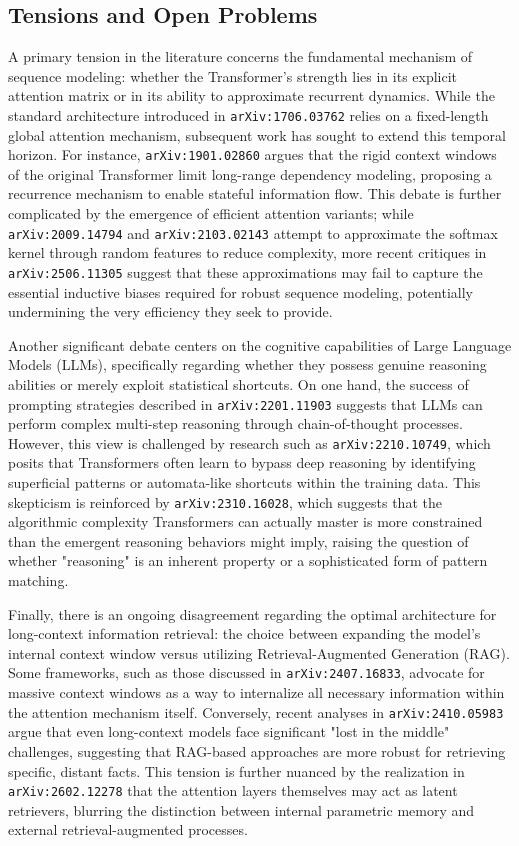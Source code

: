 \documentclass[11pt]{article}
\begin{document}
\subsection{Tensions and Open Problems}

A primary tension in the literature concerns the fundamental mechanism of sequence modeling: whether the Transformer's strength lies in its explicit attention matrix or in its ability to approximate recurrent dynamics. While the standard architecture introduced in \texttt{arXiv:1706.03762} relies on a fixed-length global attention mechanism, subsequent work has sought to extend this temporal horizon. For instance, \texttt{arXiv:1901.02860} argues that the rigid context windows of the original Transformer limit long-range dependency modeling, proposing a recurrence mechanism to enable stateful information flow. This debate is further complicated by the emergence of efficient attention variants; while \texttt{arXiv:2009.14794} and \texttt{arXiv:2103.02143} attempt to approximate the softmax kernel through random features to reduce complexity, more recent critiques in \texttt{arXiv:2506.11305} suggest that these approximations may fail to capture the essential inductive biases required for robust sequence modeling, potentially undermining the very efficiency they seek to provide.

Another significant debate centers on the cognitive capabilities of Large Language Models (LLMs), specifically regarding whether they possess genuine reasoning abilities or merely exploit statistical shortcuts. On one hand, the success of prompting strategies described in \texttt{arXiv:2201.11903} suggests that LLMs can perform complex multi-step reasoning through chain-of-thought processes. However, this view is challenged by research such as \texttt{arXiv:2210.10749}, which posits that Transformers often learn to bypass deep reasoning by identifying superficial patterns or automata-like shortcuts within the training data. This skepticism is reinforced by \texttt{arXiv:2310.16028}, which suggests that the algorithmic complexity Transformers can actually master is more constrained than the emergent reasoning behaviors might imply, raising the question of whether "reasoning" is an inherent property or a sophisticated form of pattern matching.

Finally, there is an ongoing disagreement regarding the optimal architecture for long-context information retrieval: the choice between expanding the model's internal context window versus utilizing Retrieval-Augmented Generation (RAG). Some frameworks, such as those discussed in \texttt{arXiv:2407.16833}, advocate for massive context windows as a way to internalize all necessary information within the attention mechanism itself. Conversely, recent analyses in \texttt{arXiv:2410.05983} argue that even long-context models face significant "lost in the middle" challenges, suggesting that RAG-based approaches are more robust for retrieving specific, distant facts. This tension is further nuanced by the realization in \texttt{arXiv:2602.12278} that the attention layers themselves may act as latent retrievers, blurring the distinction between internal parametric memory and external retrieval-augmented processes.
\end{document}
